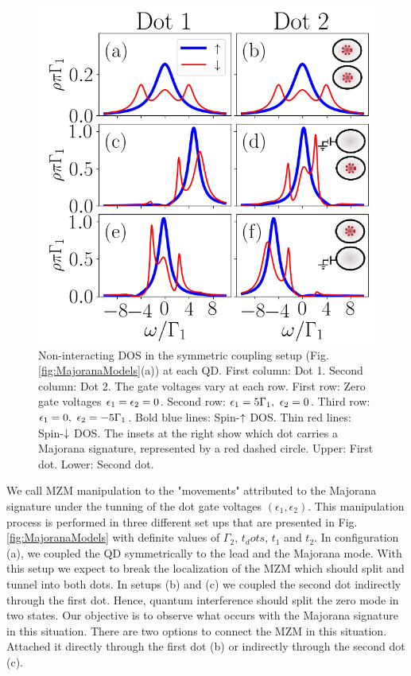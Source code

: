 \documentclass[showpacs,aps,prb,reprint,superscriptaddress]{revtex4-1}
\begin{document}
	\begin{figure}[bt]
		\begin{center}
		\includegraphics[scale=0.48]{Graficos/t1=t2.png}
		\caption{ \label{fig:t1=t2}  Non-interacting DOS in the symmetric coupling setup (Fig.\ref{fig:MajoranaModels}(a)) at each QD. First column: Dot 1. Second column: Dot 2. The gate voltages vary at each row.  First row: Zero gate voltages $\epsilon_1=\epsilon_2=0$. Second row: $\epsilon_1=5\Gamma_1, \ \epsilon_2 =0$.  Third row: $\epsilon_1=0, \ \epsilon_2 =-5\Gamma_1$.  Bold blue lines: Spin-$\uparrow$ DOS. Thin red lines: Spin-$\downarrow$ DOS. The insets at the right show which dot carries a Majorana signature, represented by a red dashed circle. Upper: First dot. Lower: Second dot. 
		}
	\end{center}
	\end{figure}

We call MZM manipulation to the "movements" attributed to the Majorana signature under the tunning of the dot gate voltages $( \epsilon_1 , \epsilon_2 )$. This manipulation process is performed in three different set ups that are presented in Fig.\ref{fig:MajoranaModels} with definite values of $\Gamma_2$, $t_dots$, $t_1$ and $t_2$. In configuration (a), we coupled the QD symmetrically to the lead and the Majorana mode. With this setup we expect to break the localization of the MZM which should split and tunnel into both dots. In setups (b) and (c) we coupled the second dot indirectly through the first dot. Hence, quantum  interference should split the zero mode in two states. Our objective is to observe what occurs with the Majorana signature in this situation. There are two options to connect the MZM in this situation. Attached it directly through the first dot (b) or indirectly through the second dot (c). 
\end{document}
